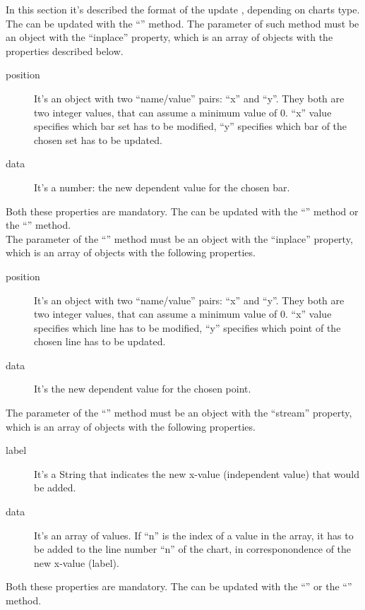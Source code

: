			In this section it's described the format of the update , depending on charts type. 
				The  can be updated with the “” method. The parameter of such method must be an object with the “inplace” property, which is an array of objects with the properties described below.
				\begin{description}
					\item[position] It's an object with two “name/value” pairs: “x” and “y”. They both are two integer values, that can assume a minimum value of 0. “x” value specifies which bar set has to be modified, “y” specifies which bar of the chosen set has to be updated.
					\item[data] It's a number: the new dependent value for the chosen bar.
				\end{description}
				Both these properties are mandatory.
				The  can be updated with the “” method or the “” method.\\
				The parameter of the “” method must be an object with the “inplace” property, which is an array of objects with the following properties.
				\begin{description}
					\item[position] It's an object with two “name/value” pairs: “x” and “y”. They both are two integer values, that can assume a minimum value of 0. “x” value specifies which line has to be modified, “y” specifies which point of the chosen line has to be updated.
					\item[data] It's the new dependent value for the chosen point.
				\end{description}
				The parameter of the “” method must be an object with the “stream” property, which is an array of objects with the following properties.
				\begin{description}
					\item[label] It's a String that indicates the new x-value (independent value) that would be added.
					\item[data] It's an array of values. If “n” is the index of a value in the array, it has to be added to the line number “n” of the chart, in corresponondence of the new x-value (label).
				\end{description}
				Both these properties are mandatory.
				The  can be updated with the “” or the “” method.\\
